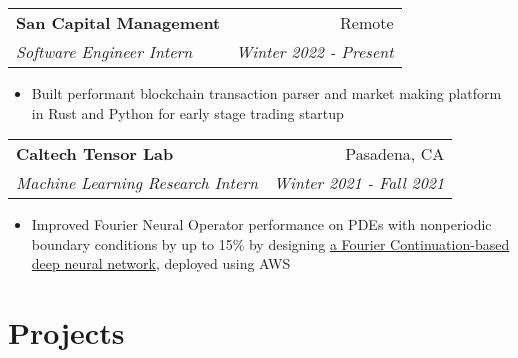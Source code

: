 \documentclass[letterpaper,11pt]{article}
\makeatletter
\newcommand{\resitem}[1]{\item[--] #1}
\newcommand{\ressubheading}[4]{
	\vspace{3pt}
	\begin{tabular*}{7.5in}{l@{\extracolsep{\fill}}r}
			\textbf{#1} & #2 \\
			\textit{#3} & \textit{#4}
	\end{tabular*}
}
\newcommand{\projsubheading}[2]{
	\vspace{3pt}
	\begin{tabular*}{7.5in}{l@{\extracolsep{\fill}}r}
		\textbf{#1} & #2
	\end{tabular*}
}
\makeatother
\begin{document}
\ressubheading{San Capital Management}{Remote}{Software Engineer Intern}
{Winter 2022 - Present}
\begin{itemize}
	\resitem{
		Built performant blockchain transaction parser and market making
		platform in Rust and Python for early stage trading startup
	}
\end{itemize}

\ressubheading{Caltech Tensor Lab}
{Pasadena, CA}
{Machine Learning Research Intern}
{Winter 2021 - Fall 2021}
\begin{itemize}
	\resitem{
		Improved Fourier Neural Operator performance on PDEs with nonperiodic
		boundary conditions by up to 15\% by designing
		\href{https://symposium.foragerone.com/caltech-sfp-summer-seminar-day-2021/presentations/32348}
		{a Fourier Continuation-based deep neural network},
		deployed using AWS
	}
\end{itemize}


\section{Projects}

\end{document}
